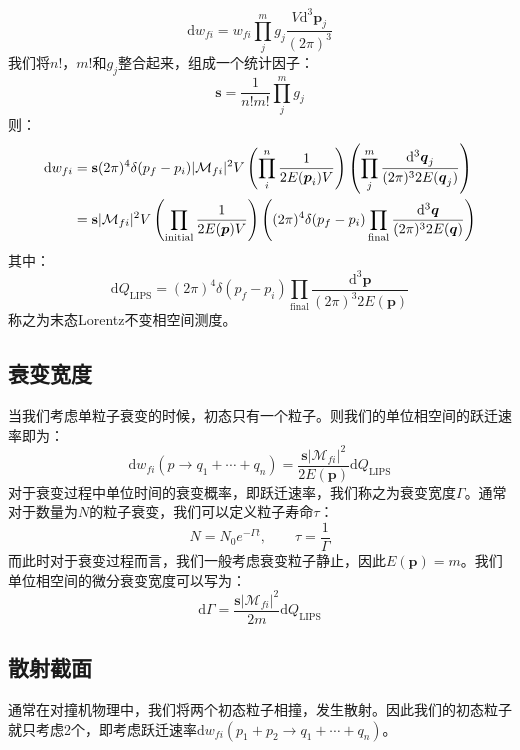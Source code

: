 \begin{equation}
\mathrm{d}w_{fi}=w_{fi}\prod_{j}^m g_j\frac{V\mathrm{d}^3\boldsymbol{p}_j}{(2\pi)^3}
\end{equation}
我们将$n!$，$m!$和$g_j$整合起来，组成一个统计因子：
\begin{equation}
\textbf{s}=\frac{1}{n!m!}\prod_j^m g_j
\end{equation}
则：
\begin{align}
\mathrm{d}w_{fi}&=\textbf{s}(2\pi)^4\delta(p_f-p_i)|\mathcal{M}_{fi}|^2V\left(\prod_{i}^{n}\frac{1}{2E(\boldsymbol{p}_i)V}\right)\left(\prod_{j}^{m}\frac{\mathrm{d}^3\boldsymbol{q}_j}{(2\pi)^3 2E(\boldsymbol{q}_j)}\right)\notag\\
&=\textbf{s}|\mathcal{M}_{fi}|^2V\left(\prod_{\text{initial}}\frac{1}{2E(\boldsymbol{p})V}\right)\left((2\pi)^4\delta(p_f-p_i)\prod_{\text{final}}\frac{\mathrm{d}^3\boldsymbol{q}}{(2\pi)^3 2E(\boldsymbol{q})}\right)
\end{align}
其中：
\begin{equation}
\mathrm{d}Q_{\text{LIPS}}=(2\pi)^4\delta(p_f-p_i)\prod_{\text{final}}\frac{\mathrm{d}^3\boldsymbol{p}}{(2\pi)^3 2E(\boldsymbol{p})}
\label{eq:dlips}
\end{equation}
称之为末态Lorentz不变相空间测度。
\subsection{衰变宽度}
当我们考虑单粒子衰变的时候，初态只有一个粒子。则我们的单位相空间的跃迁速率即为：
\begin{equation}
\mathrm{d}w_{fi}(p\rightarrow q_1+\cdots+q_n)=\frac{\textbf{s}|\mathcal{M}_{fi}|^2}{2E(\boldsymbol{p})}\mathrm{d}Q_{\text{LIPS}}
\end{equation}
对于衰变过程中单位时间的衰变概率，即跃迁速率，我们称之为衰变宽度$\Gamma$。通常对于数量为$N$的粒子衰变，我们可以定义粒子寿命$\tau$：
\begin{equation}
N=N_0 e^{-\Gamma t},\qquad \tau=\frac{1}{\Gamma}
\end{equation}
而此时对于衰变过程而言，我们一般考虑衰变粒子静止，因此$E(\boldsymbol{p})=m$。我们单位相空间的微分衰变宽度可以写为：
\begin{equation}
\mathrm{d}\Gamma=\frac{\textbf{s}|\mathcal{M}_{fi}|^2}{2m}\mathrm{d}Q_{\text{LIPS}}
\end{equation}
\subsection{散射截面}
通常在对撞机物理中，我们将两个初态粒子相撞，发生散射。因此我们的初态粒子就只考虑2个，即考虑跃迁速率$\mathrm{d}w_{fi}(p_1+p_2\rightarrow q_1+\cdots+q_n)$。


